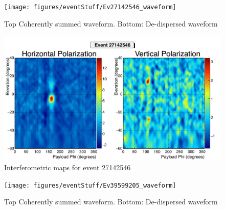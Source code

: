 	
	
	
			\begin{figure}
			\centering
				\texttt{[image: figures/eventStuff/Ev27142546\_waveform]}
				\caption{Top Coherently summed waveform.  Bottom: De-dispersed waveform} 
			\label{fig:Ev27142546_waveform}
			\end{figure}		

		\begin{figure}
		\centering
			\includegraphics[width=\textwidth]{figures/intMap/intMap_ev27142546}
			\caption{Interferometric maps for event 27142546} 
		\label{fig:Ev27142546_map}
		\end{figure}			
			
			\begin{figure}
			\centering
				\texttt{[image: figures/eventStuff/Ev39599205\_waveform]}
				\caption{Top Coherently summed waveform.  Bottom: De-dispersed waveform} 
			\label{fig:Ev39599205_waveform}
			\end{figure}
			
